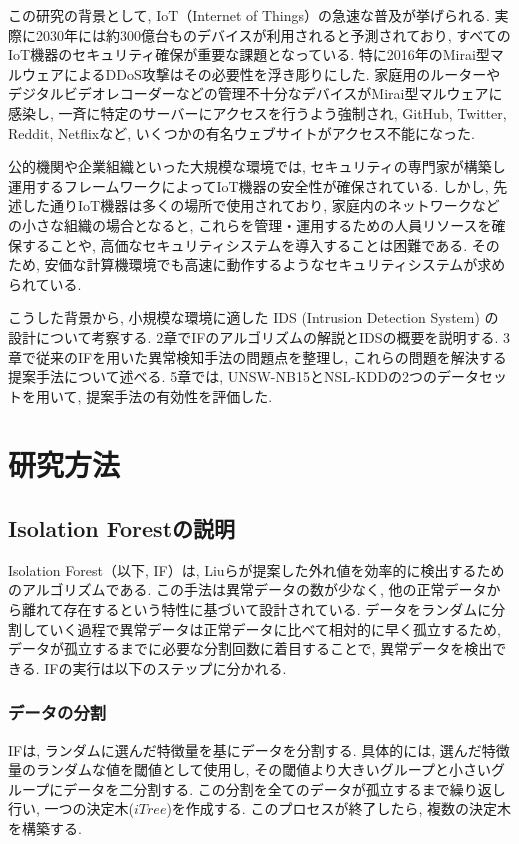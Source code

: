 \documentclass{css}
\begin{document}
この研究の背景として, IoT（Internet of Things）の急速な普及が挙げられる. 実際に2030年には約300億台ものデバイスが利用されると予測されており\cite{Vailshery2022}, すべてのIoT機器のセキュリティ確保が重要な課題となっている. 特に2016年のMirai型マルウェアによるDDoS攻撃はその必要性を浮き彫りにした\cite{8115504}.  家庭用のルーターやデジタルビデオレコーダーなどの管理不十分なデバイスがMirai型マルウェアに感染し, 一斉に特定のサーバーにアクセスを行うよう強制され, GitHub, Twitter, Reddit, Netflixなど, いくつかの有名ウェブサイトがアクセス不能になった.

公的機関や企業組織といった大規模な環境では, セキュリティの専門家が構築し運用するフレームワークによってIoT機器の安全性が確保されている. しかし, 先述した通りIoT機器は多くの場所で使用されており, 家庭内のネットワークなどの小さな組織の場合となると, これらを管理・運用するための人員リソースを確保することや, 高価なセキュリティシステムを導入することは困難である. そのため, 安価な計算機環境でも高速に動作するようなセキュリティシステムが求められている.

こうした背景から, 小規模な環境に適した IDS (Intrusion Detection System) の設計について考察する. 2章でIFのアルゴリズムの解説とIDSの概要を説明する. 3章で従来のIFを用いた異常検知手法の問題点を整理し, これらの問題を解決する提案手法について述べる. 5章では, UNSW-NB15とNSL-KDDの2つのデータセットを用いて, 提案手法の有効性を評価した.

\section{研究方法}

\subsection{Isolation Forestの説明}

Isolation Forest（以下, IF）は, Liuらが提案した\cite{Liu2008-bc}外れ値を効率的に検出するためのアルゴリズムである. この手法は異常データの数が少なく, 他の正常データから離れて存在するという特性に基づいて設計されている. データをランダムに分割していく過程で異常データは正常データに比べて相対的に早く孤立するため, データが孤立するまでに必要な分割回数に着目することで, 異常データを検出できる. IFの実行は以下のステップに分かれる. 

\subsubsection{データの分割}

IFは, ランダムに選んだ特徴量を基にデータを分割する. 具体的には, 選んだ特徴量のランダムな値を閾値として使用し, その閾値より大きいグループと小さいグループにデータを二分割する. この分割を全てのデータが孤立するまで繰り返し行い, 一つの決定木($iTree$)を作成する. このプロセスが終了したら, 複数の決定木を構築する. 
\end{document}
